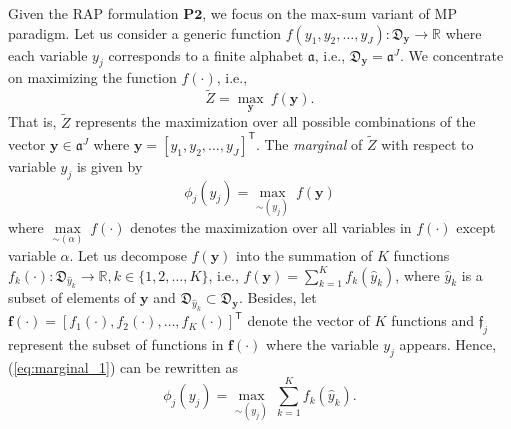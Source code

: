 \documentclass[twocolumn,10pt]{IEEEtran}
\begin{document}
Given the RAP formulation $\mathbf{P2}$, we focus on the max-sum variant \cite{max-sum} of MP paradigm. Let us consider a generic function $f(y_1, y_2, \ldots,  y_J) : \mathfrak{D}_{\mathbf{y}} \rightarrow \mathbb{R}$ where each variable $y_j$ corresponds to a finite alphabet $\mathfrak{a}$, i.e., $\mathfrak{D}_{\mathbf{y}} = \mathfrak{a}^J$. We concentrate on maximizing the function $f(\cdot)$, i.e.,
\begin{equation} \label{eq:max_1}
\tilde{Z} = \underset{\mathbf{y}}{\operatorname{max}} ~ f(\mathbf{y}).
\end{equation} 
That is, $\tilde{Z}$ represents the maximization over all possible combinations of the vector $\mathbf{y} \in \mathfrak{a}^J$ where $\mathbf{y} = [y_1, y_2, \ldots,  y_J]^\mathsf{T}$. The \textit{marginal} of $\tilde{Z}$ with respect to variable $y_j$ is given by
\begin{equation} \label{eq:marginal_1}
\phi_{j}(y_j) = \underset{\sim (y_j)}{\operatorname{max}} ~ f(\mathbf{y})
\end{equation}
where $\underset{\sim (\alpha)}{\operatorname{max}} ~ f(\cdot)$ denotes the maximization over all variables in $f(\cdot)$ except variable $\alpha$. Let us decompose $f(\mathbf{y})$ into the summation of $K$ functions
$f_k(\cdot) : \mathfrak{D}_{\widehat{y}_k} \rightarrow \mathbb{R}, k \in \lbrace 1, 2, \ldots, K \rbrace $, i.e., $f(\mathbf{y}) = \displaystyle \sum_{k=1}^{K} f_k(\widehat{y}_k)$, where $\widehat{y}_k$ is a subset of elements of $\mathbf{y}$ and $\mathfrak{D}_{\widehat{y}_k} \subset \mathfrak{D}_{\mathbf{y}}$. Besides, let $\mathbf{f}\boldsymbol{(\cdot)} = \left[f_1(\cdot), f_2(\cdot), \ldots, f_K(\cdot) \right]^\mathsf{T}$ denote the vector of $K$ functions and $\mathfrak{f}_j$ represent the subset of functions in $\mathbf{f}\boldsymbol{(\cdot)}$ where the variable $y_j$ appears.  Hence, (\ref{eq:marginal_1}) can be rewritten as
\begin{equation}
\phi_{j}(y_j) = \underset{\sim (y_j)}{\operatorname{max}} ~ \sum_{k=1}^{K} f_k(\widehat{y}_k).
\end{equation}
\end{document}
